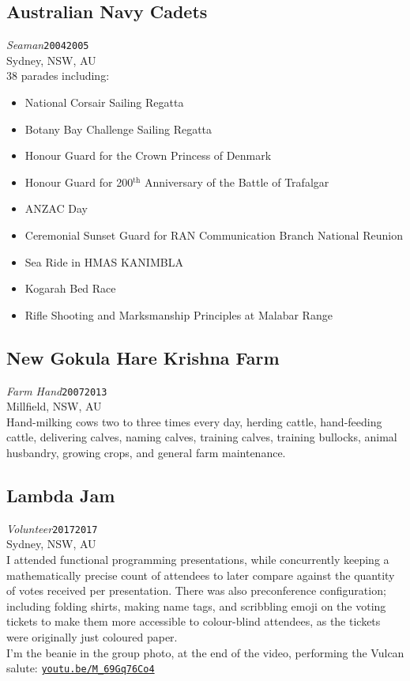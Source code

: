 \documentclass[12pt,a4paper,oneside]{article}
\newcommand{\xp}[6]{{\normalsize\textit{#1}\hfill\texttt{#5}\\\phantom{menace}\hfill#2, #3, #4}\\}
\newcommand{\textapprox}{\raisebox{0.5ex}{\texttildelow}}
\begin{document}
\subsection{Australian Navy Cadets}
\xp{Seaman}{Sydney}{NSW}{AU}{2004\textapprox{}2005}
\\38 parades including:
\begin{itemize}
	\item National Corsair Sailing Regatta
	\item Botany Bay Challenge Sailing Regatta
	\item Honour Guard for the Crown Princess of Denmark
	\item Honour Guard for 200$^\text{th}$ Anniversary of the Battle of Trafalgar
	\item ANZAC Day
	\item Ceremonial Sunset Guard for RAN Communication Branch $\text{National Reunion}$
	\item Sea Ride in HMAS KANIMBLA
	\item Kogarah Bed Race
	\item Rifle Shooting and Marksmanship Principles at Malabar Range
\end{itemize}
\subsection{New Gokula Hare Krishna Farm}
\xp{Farm Hand}{Millfield}{NSW}{AU}{2007\textapprox{}2013}
\\Hand-milking cows two to three times every day, herding cattle, hand-feeding cattle, delivering calves, naming calves, training calves, training bullocks, animal husbandry, growing crops, and general farm maintenance.
\subsection{Lambda Jam}
\xp{Volunteer}{Sydney}{NSW}{AU}{2017\textapprox{}2017}
\\I attended functional programming presentations, while concurrently keeping a mathematically precise count of attendees to later compare against the quantity of votes received per presentation. There was also preconference configuration; including folding shirts, making name tags, and scribbling emoji on the voting tickets to make them more accessible to colour-blind attendees, as the tickets were originally just coloured paper.
\\I'm the beanie in the group photo, at the end of the video, performing the Vulcan salute: \href{https://www.youtube.com/watch?v=M_69Gq76Co4}{\texttt{youtu.be/M\_69Gq76Co4}}%
\end{document}
